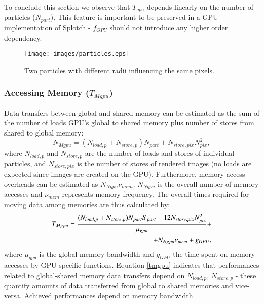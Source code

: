 \documentclass[1p]{elsarticle}
\begin{document}
To conclude this section we observe that $T_{gpu}$ depends linearly on the number of particles ($N_{part}$). This feature is important to be preserved in a GPU implementation of Splotch - $f_{GPU}$ should not introduce any higher order dependency. 

\begin{figure}
\centering
\texttt{[image: images/particles.eps]}
\caption{Two particles with different radii influencing the same pixels.}
\label{fig:particles}
\end{figure}


\subsubsection{Accessing Memory ($T_{Mgpu}$)}
Data transfers between global and shared memory can be estimated 
as the sum of the number of loads 
GPU's global to shared memory plus number of stores from shared to global memory:
\begin{equation}
N_{Mgpu} = (N_{load,p} + N_{store,p}) N_{part} + N_{store,pix} N_{pix}^2,
\end{equation}
where $N_{load,p}$ and $N_{store,p}$ are the number of loads and stores of individual 
particles, and $N_{store,pix}$ is the number of stores of rendered images (no loads 
are expected since images are created on the GPU). 
Furthermore, memory access overheads can be estimated as $N_{Ngpu} \nu_{mem}$. $N_{Ngpu}$ is the overall number of memory accesses and $\nu_{mem}$ represents memory frequency. The overall times required for moving data among memories are thus calculated by:
\begin{equation}\label{tmgpu}
\begin{split}
T_{Mgpu} = {(N_{load,p} + N_{store,p}) N_{part} S_{part}
+ 12 N_{store,pix} N_{pix}^2\over \mu_{gpu}} + \\
+ N_{Ngpu} \nu_{mem} + g_{GPU},
\end{split}
\end{equation}
where $\mu_{gpu}$ is the global memory bandwidth
and $g_{GPU}$ the time 
spent on memory accesses by GPU specific functions. Equation \eqref{tmgpu} indicates that performances related to global-shared memory data transfers depend on $N_{load,p}$, $N_{store,p}$ - these quantify amounts of data transferred from global to shared memories and vice-versa. Achieved performances depend on memory bandwidth.
\end{document}
